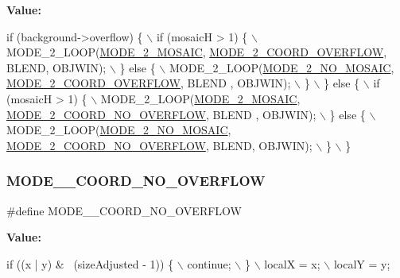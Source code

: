 {\bfseries Value\+:}
\begin{DoxyCode}
\textcolor{keywordflow}{if} (background->overflow) \{ \(\backslash\)
        if (mosaicH > 1) \{ \(\backslash\)
            MODE\_2\_LOOP(\mbox{\hyperlink{software-bg_8c_af363f69e67cd850494fefb9983f83cfd}{MODE\_2\_MOSAIC}}, \mbox{\hyperlink{software-bg_8c_a4d650cc71d278fc9352c80391eb2243a}{MODE\_2\_COORD\_OVERFLOW}}, BLEND, 
      OBJWIN); \(\backslash\)
        \} \textcolor{keywordflow}{else} \{ \(\backslash\)
            MODE\_2\_LOOP(\mbox{\hyperlink{software-bg_8c_a523cbe774cf992170ce1867f40de6981}{MODE\_2\_NO\_MOSAIC}}, \mbox{\hyperlink{software-bg_8c_a4d650cc71d278fc9352c80391eb2243a}{MODE\_2\_COORD\_OVERFLOW}}, BLEND
      , OBJWIN); \(\backslash\)
        \} \(\backslash\)
    \} \textcolor{keywordflow}{else} \{ \(\backslash\)
        if (mosaicH > 1) \{ \(\backslash\)
            MODE\_2\_LOOP(\mbox{\hyperlink{software-bg_8c_af363f69e67cd850494fefb9983f83cfd}{MODE\_2\_MOSAIC}}, \mbox{\hyperlink{software-bg_8c_a33b56251cddcc3943361a51d34aa7e6d}{MODE\_2\_COORD\_NO\_OVERFLOW}}, BLEND
      , OBJWIN); \(\backslash\)
        \} \textcolor{keywordflow}{else} \{ \(\backslash\)
            MODE\_2\_LOOP(\mbox{\hyperlink{software-bg_8c_a523cbe774cf992170ce1867f40de6981}{MODE\_2\_NO\_MOSAIC}}, 
      \mbox{\hyperlink{software-bg_8c_a33b56251cddcc3943361a51d34aa7e6d}{MODE\_2\_COORD\_NO\_OVERFLOW}}, BLEND, OBJWIN); \(\backslash\)
        \} \(\backslash\)
    \}
\end{DoxyCode}
\mbox{\label{software-bg_8c_a33b56251cddcc3943361a51d34aa7e6d}} 
\subsubsection{\texorpdfstring{M\+O\+D\+E\+\_\+\_\+\+C\+O\+O\+R\+D\+\_\+\+N\+O\+\_\+\+O\+V\+E\+R\+F\+L\+OW}{MODE\_2\_COORD\_NO\_OVERFLOW}}
{\footnotesize\ttfamily \#define M\+O\+D\+E\+\_\+\_\+\+C\+O\+O\+R\+D\+\_\+\+N\+O\+\_\+\+O\+V\+E\+R\+F\+L\+OW}

{\bfseries Value\+:}
\begin{DoxyCode}
\textcolor{keywordflow}{if} ((x | y) & ~(sizeAdjusted - 1)) \{ \(\backslash\)
        continue; \(\backslash\)
    \} \(\backslash\)
    localX = x; \(\backslash\)
    localY = y;
\end{DoxyCode}
\mbox{\label{software-bg_8c_a4d650cc71d278fc9352c80391eb2243a}} 
